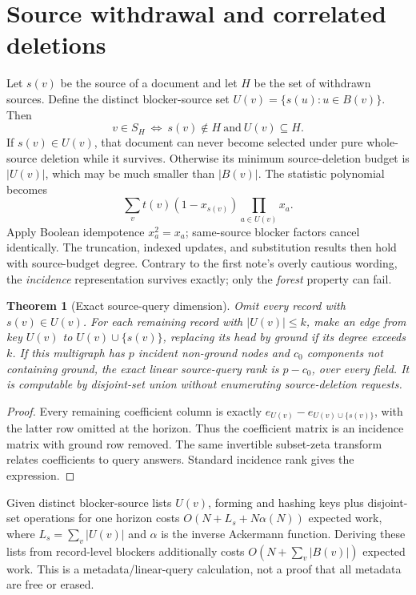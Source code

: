 \documentclass[11pt,a4paper]{article}
\newtheorem{theorem}{Theorem}[section]
\theoremstyle{definition}\newtheorem{definition}[theorem]{Definition}
\begin{document}
\section{Source withdrawal and correlated deletions}\label{sec:sources}
Let $s(v)$ be the source of a document and let $H$ be the set of withdrawn sources. Define the distinct blocker-source set $U(v)=\{s(u):u\in B(v)\}$. Then
\begin{equation}
 v\in S_H\ \Longleftrightarrow\ s(v)\notin H\ \text{and}\ U(v)\subseteq H.
\end{equation}
If $s(v)\in U(v)$, that document can never become selected under pure whole-source deletion while it survives. Otherwise its minimum source-deletion budget is $|U(v)|$, which may be much smaller than $|B(v)|$. The statistic polynomial becomes
\[
 \sum_v t(v)(1-x_{s(v)})\prod_{a\in U(v)}x_a.
\]
Apply Boolean idempotence $x_a^2=x_a$; same-source blocker factors cancel identically. The truncation, indexed updates, and substitution results then hold with source-budget degree. Contrary to the first note's overly cautious wording, the \emph{incidence} representation survives exactly; only the \emph{forest} property can fail.

\begin{theorem}[Exact source-query dimension]\label{thm:source}
Omit every record with $s(v)\in U(v)$. For each remaining record with $|U(v)|\le k$, make an edge from key $U(v)$ to $U(v)\cup\{s(v)\}$, replacing its head by ground if its degree exceeds $k$. If this multigraph has $p$ incident non-ground nodes and $c_0$ components not containing ground, the exact linear source-query rank is $p-c_0$, over every field. It is computable by disjoint-set union without enumerating source-deletion requests.
\end{theorem}
\begin{proof}
Every remaining coefficient column is exactly $e_{U(v)}-e_{U(v)\cup\{s(v)\}}$, with the latter row omitted at the horizon. Thus the coefficient matrix is an incidence matrix with ground row removed. The same invertible subset-zeta transform relates coefficients to query answers. Standard incidence rank gives the expression.
\end{proof}
Given distinct blocker-source lists $U(v)$, forming and hashing keys plus disjoint-set operations for one horizon costs $O(N+L_s+N\alpha(N))$ expected work, where $L_s=\sum_v|U(v)|$ and $\alpha$ is the inverse Ackermann function. Deriving these lists from record-level blockers additionally costs $O(N+\sum_v|B(v)|)$ expected work. This is a metadata/linear-query calculation, not a proof that all metadata are free or erased.
\end{document}
